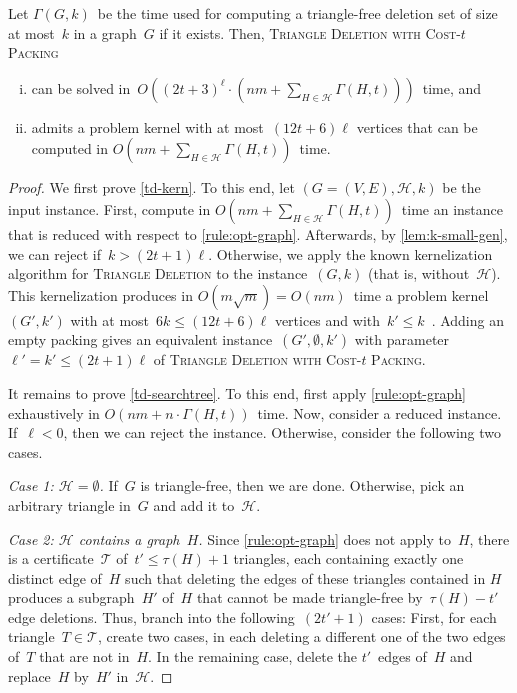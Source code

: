 \documentclass[envcountsame,numbook,smallextended]{svjour3}
\numberwithin{equation}{section}
\numberwithin{figure}{section}
\newcommand{\packing}{\ensuremath{\mathcal H}}
\newcommand{\TAGP}{\textsc{Triangle Deletion with  Cost-$t$ Packing}}
\newcommand{\Time}{\ensuremath{\Gamma}}
\begin{document}
\begin{theorem}\label{thm:td-kern-general}
Let $\Time(G,k)$~be the time used for computing a triangle-free deletion set of size at most~\(k\) in a graph~\(G\) if it exists. Then, \TAGP{}
  \begin{enumerate}[(i)]
  \item\label{td-searchtree} can be solved in~$O((2t+3)^\ell \cdot (nm + \sum_{H\in \packing} \Time(H,t)))$~time, and
  \item\label{td-kern} admits a problem kernel with at most~$(12t+6) \ell$ vertices that can be computed in $O(nm+\sum_{H\in \packing} \Time(H,t))$~time.
  \end{enumerate}
\end{theorem}
\begin{proof}
  We first prove \eqref{td-kern}.  To this end, let $(G=(V,E),\packing,k)$ be the input instance.  First, compute in $O(nm+\sum_{H\in \packing} \Time(H,t))$~time an instance that is reduced with respect to \cref{rule:opt-graph}. Afterwards, by \cref{lem:k-small-gen}, we can reject if~$k > (2t+1)\ell$.  Otherwise, we apply the known kernelization algorithm for \textsc{Triangle Deletion} to the instance~$(G,k)$ (that is, without~$\packing$). This kernelization produces in $O(m\sqrt{m})=O(nm)$~time a problem kernel~$(G',k')$ with at most~$6k\le (12t+6)\ell$ vertices and with~$k'\le k$~\cite{BKM09}. Adding an empty packing gives an equivalent instance~$(G',\emptyset,k')$ with parameter~$\ell'=k'\le (2t+1)\ell$ of \TAGP.

  It remains to prove \eqref{td-searchtree}.  To this end, first apply \cref{rule:opt-graph} exhaustively in $O(nm + n\cdot \Time(H,t))$~time.  Now, consider a reduced instance. If~$\ell<0$, then we can reject the instance. Otherwise, consider the following two cases.
  
  \emph{Case 1: $\packing=\emptyset$.} If~$G$ is triangle-free, then we are done. Otherwise, pick an arbitrary triangle in~$G$ and add it to~$\packing$.

  \emph{Case 2: $\packing$ contains a graph~$H$.} Since \cref{rule:opt-graph} does not apply to~$H$, there is a certificate~$\mathcal{T}$ of~$t'\le \tau(H)+1$ triangles, each containing exactly one distinct edge of~$H$ such that deleting the edges of these triangles contained in $H$ produces a subgraph~$H'$ of~$H$ that cannot be made triangle-free by~$\tau(H)-t'$ edge deletions.  Thus, branch into the following~$(2t'+1)$ cases: First, for each triangle~$T\in \mathcal{T}$, create two cases, in each deleting a different one of the two edges of~$T$ that are not in~$H$. In the remaining case, delete the $t'$~edges of~$H$ and replace~$H$ by~$H'$ in~$\packing$.



\end{proof}
\end{document}

